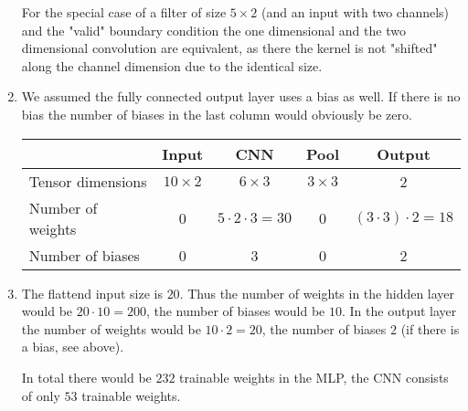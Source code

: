 \documentclass[DIN, pagenumber=false, fontsize=11pt, parskip=half]{scrartcl}
\begin{document}
\begin{enumerate}
            For the special case of a filter of size $5 \times 2$ (and an input with two channels) and the "valid" 
            boundary condition the one dimensional and the two dimensional convolution are equivalent, 
            as there the kernel is not "shifted" along the channel dimension due to the identical size. 
        \item We assumed the fully connected output layer uses a bias as well. 
            If there is no bias the number of biases in the last column would obviously be zero.
            \begin{table}[H]
                \centering
                \begin{tabular}{lcccc}
                    \toprule
                     & Input & CNN & Pool & Output \\
                    \midrule
                    Tensor dimensions & $10 \times 2$ & $ 6 \times 3 $ & $3 \times 3$ & 2\\
                    Number of weights & 0 & $5 \cdot 2 \cdot 3 = 30$ & 0 & $(3 \cdot 3) \cdot 2 = 18$ \\
                    Number of biases & 0 & 3 & 0 & 2 \\
                    \bottomrule
                \end{tabular}
            \end{table}
        \item
            The flattend input size is $20$. Thus the number of weights in the hidden layer would be $20 \cdot 10 = 200$,
            the number of biases would be $10$. In the output layer the number of weights would be $10 \cdot 2 = 20$,
            the number of biases $2$ (if there is a bias, see above).

            In total there would be $232$ trainable weights in the MLP, the CNN consists of only $53$ trainable weights.
    \end{enumerate} 
\end{document}
